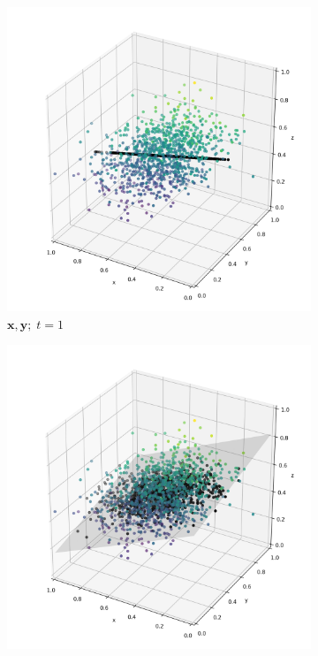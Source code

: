 \documentclass[]{article}
\newcommand{\xx}{\mathbf{x}}
\newcommand{\yy}{\mathbf{y}}
\begin{document}
\begin{figure}[H]
	\centering
	\begin{subfigure}{0.3\textwidth}
		\includegraphics[width=\linewidth]{resources/X_Y_1_simulated.png}
		\caption{$\xx, \yy; \; t=1$}
		\label{fig:1}
	\end{subfigure}\hfil
	\begin{subfigure}{0.3\textwidth}
		\includegraphics[width=\linewidth]{resources/X_Y_2_simulated.png}

\end{subfigure}
\end{figure}
\end{document}
